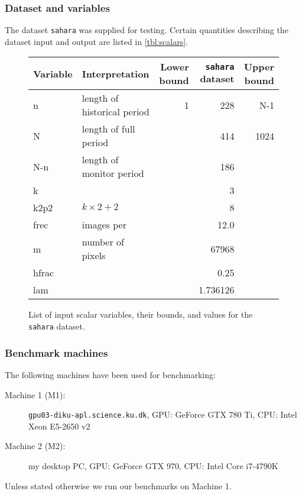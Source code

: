     

\subsubsection{Dataset and variables}

The dataset \texttt{sahara} was supplied for testing. Certain quantities
describing the dataset input and output are listed in \autoref{tbl:scalars}.


\begin{figure}[H]
    \centering
    \begin{tabular}{l l r r r}
    \textbf{Variable} & \textbf{Interpretation}              & \textbf{Lower bound} & \textbf{\texttt{sahara} dataset} & \textbf{Upper bound} \\ \hline
        n                & length of historical period & 1           & 228                     & N-1 \\
        N                & length of full period       &             & 414                     & 1024   \\
        N-n              & length of monitor period    &             & 186                     & \\
        k                &                             &             & 3                       & \\
        k2p2             & \(k\times2 + 2\)            &             & 8                       & \\
        frec             & images per                  &             & 12.0                    & \\
        m                & number of pixels            &             & 67968                   & \\
        hfrac            &                             &             & 0.25                    & \\
        lam              &                             &             & 1.736126                &
    \end{tabular}
    \caption{List of input scalar variables, their bounds, and values for the \texttt{sahara} dataset.}
    \label{tbl:scalars}
\end{figure}



\subsubsection{Benchmark machines}\label{sec:machines}

The following machines have been used for benchmarking:
%
\begin{description}
  \item[Machine 1 (M1): ]
    \texttt{gpu03-diku-apl.science.ku.dk}, GPU: GeForce GTX 780 Ti, CPU: Intel Xeon E5-2650 v2
  \item[Machine 2 (M2): ]
    my desktop PC, GPU: GeForce GTX 970, CPU: Intel Core i7-4790K
\end{description}

Unless stated otherwise we run our benchmarks on Machine 1.






